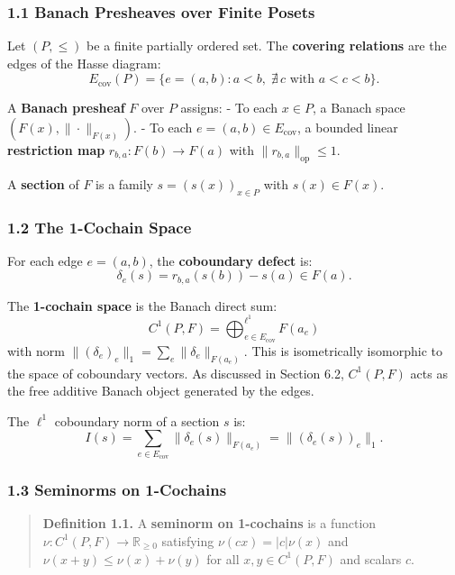 \documentclass[
]{article}
\begin{document}
\subsubsection{1.1 Banach Presheaves over Finite
Posets}\label{banach-presheaves-over-finite-posets}

Let \((P, \leq)\) be a finite partially ordered set. The
\textbf{covering relations} are the edges of the Hasse diagram:
\[E_{\text{cov}}(P) = \{e = (a, b) : a < b,\; \nexists\, c \text{ with } a < c < b\}.\]

A \textbf{Banach presheaf} \(F\) over \(P\) assigns: - To each
\(x \in P\), a Banach space \((F(x), \|\cdot\|_{F(x)})\). - To each
\(e = (a, b) \in E_{\text{cov}}\), a bounded linear \textbf{restriction
map} \(r_{b,a}: F(b) \to F(a)\) with \(\|r_{b,a}\|_{\text{op}} \leq 1\).

A \textbf{section} of \(F\) is a family \(s = (s(x))_{x \in P}\) with
\(s(x) \in F(x)\).

\subsubsection{1.2 The 1-Cochain Space}\label{the-1-cochain-space}

For each edge \(e = (a, b)\), the \textbf{coboundary defect} is:
\[\delta_e(s) = r_{b,a}(s(b)) - s(a) \in F(a).\]

The \textbf{1-cochain space} is the Banach direct sum:
\[C^1(P, F) = \bigoplus_{e \in E_{\text{cov}}}^{\ell^1} F(a_e)\] with
norm \(\|(\delta_e)_e\|_1 = \sum_e \|\delta_e\|_{F(a_e)}\). This is
isometrically isomorphic to the space of coboundary vectors. As
discussed in Section 6.2, \(C^1(P, F)\) acts as the free additive Banach
object generated by the edges.

The \(\ell^1\) coboundary norm of a section \(s\) is:
\[I(s) = \sum_{e \in E_{\text{cov}}} \|\delta_e(s)\|_{F(a_e)} = \|(\delta_e(s))_e\|_1.\]

\subsubsection{1.3 Seminorms on
1-Cochains}\label{seminorms-on-1-cochains}

\begin{quote}
\textbf{Definition 1.1.} A \textbf{seminorm on 1-cochains} is a function
\(\nu: C^1(P, F) \to \mathbb{R}_{\geq 0}\) satisfying
\(\nu(cx) = |c|\nu(x)\) and \(\nu(x+y) \leq \nu(x) + \nu(y)\) for all
\(x,y \in C^1(P, F)\) and scalars \(c\).
\end{quote}
\end{document}
